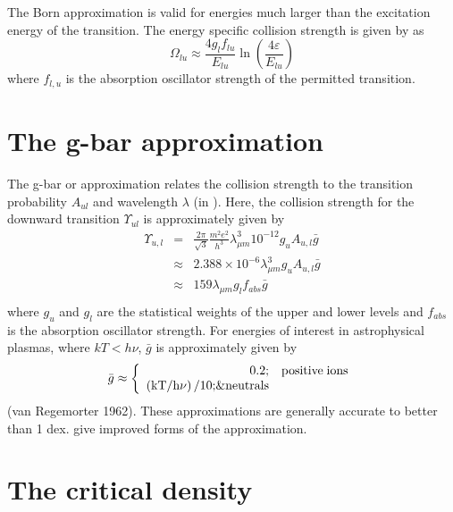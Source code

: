 The Born approximation is valid for energies much larger than the
excitation energy of the transition.
The energy specific collision strength
is given by \citet{Bethe1930} as
\begin{equation}
{\Omega _{lu}} \approx \frac{{4{g_l}{f_{lu}}}}{{{E_{lu}}}}\ln \left(
{\frac{{4\varepsilon }}{{{E_{lu}}}}} \right)
\end{equation}
where $f_{l,u}$ is the absorption oscillator strength of the permitted transition.

\section{The g-bar approximation }

The g-bar or \citet{VanRegemorter1962} approximation relates the collision
strength to the transition probability $A_{ul}$ and wavelength $\lambda$ (in \micron).
Here, the collision strength for the downward transition
${\Upsilon _{ul}}$
is approximately given by
\begin{equation}
\begin{array}{ccl}
 {\Upsilon _{u,l}}& =& \frac{{2\pi }}{{\sqrt 3
}}\frac{{{m^2}{e^2}}}{{{h^3}}}\lambda _{\mu m}^3{10^{ -
12}}{g_u}{A_{u,l}}\bar g \\
& \approx& 2.388 \times {10^{ - 6}}\lambda _{\mu m}^3{g_u}{A_{u,l}}\bar g \\
& \approx& 159{\lambda _{\mu m}}{g_l}{f_{abs}}\bar g \\
 \end{array}
\end{equation}
where $g_u$ and $g_l$ are the statistical weights of the
upper and lower levels
and $f_{abs}$ is the absorption oscillator strength.
For energies of interest
in astrophysical plasmas, where $kT<h\nu$, $\bar g$
is approximately given by
\begin{equation}
\bar g \approx \left\{ {\begin{array}{*{20}{c}}
   \hfill {0.2;} & \hfill {{\mathrm{positive}}\;{\mathrm{ions}}} \\
   \hfill {\left( {{\mathrm{kT/h}}\nu } \right)/10;}\& \hfill {{\mathrm{neutrals}}}
\\
\end{array}} \right.
\end{equation}
(van Regemorter 1962).
These approximations are generally accurate to better
than 1 dex.
\citet{Gaetz1983} give improved forms of the approximation.

\section{The critical density }

